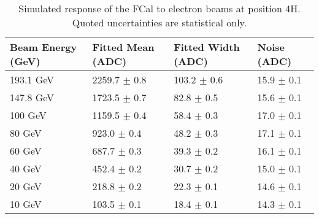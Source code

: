 \begin{table}[p]
\begin{center}
\begin{tabular}{|l|l|l|l|}
\hline
Beam Energy (GeV) & Fitted Mean (ADC)& Fitted Width (ADC)& Noise (ADC) \\
\hline
193.1 GeV  &  2259.7 $\pm$     0.8 &   103.2 $\pm$     0.6 &    15.9 $\pm$     0.1 \\
147.8 GeV  &  1723.5 $\pm$     0.7 &    82.8 $\pm$     0.5 &    15.6 $\pm$     0.1 \\
100 GeV  &  1159.5 $\pm$     0.4 &    58.4 $\pm$     0.3 &    17.0 $\pm$     0.1 \\
80 GeV  &   923.0 $\pm$     0.4 &    48.2 $\pm$     0.3 &    17.1 $\pm$     0.1 \\
60 GeV  &   687.7 $\pm$     0.3 &    39.3 $\pm$     0.2 &    16.1 $\pm$     0.1 \\
40 GeV  &   452.4 $\pm$     0.2 &    30.7 $\pm$     0.2 &    15.0 $\pm$     0.1 \\
20 GeV  &   218.8 $\pm$     0.2 &    22.3 $\pm$     0.1 &    14.6 $\pm$     0.1 \\
10 GeV  &   103.5 $\pm$     0.1 &    18.4 $\pm$     0.1 &    14.3 $\pm$     0.1 \\
\hline
\end{tabular}
\end{center}
\caption[Simulated response of the FCal to electron beams at position 4H]{Simulated response of the FCal to electron beams at position 4H. Quoted uncertainties are statistical only.}
\label{TBres_table_elec_4HMC}
\end{table}

